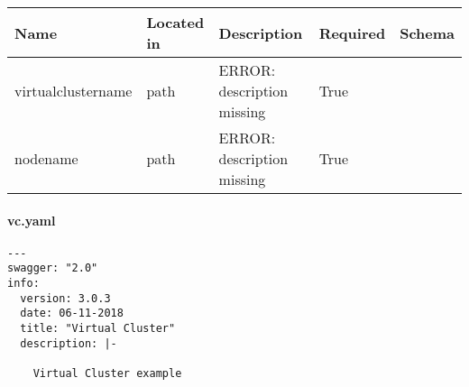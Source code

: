 \documentclass[9pt,]{article}
\let\oldparagraph\paragraph
\renewcommand{\paragraph}[1]{\oldparagraph{#1}\mbox{}}
\begin{document}
\begin{longtable}[]{@{}lllll@{}}
\toprule
Name & Located in & Description & Required & Schema\tabularnewline
\midrule
\endhead
virtualclustername & path & ERROR: description missing & True
&\tabularnewline
nodename & path & ERROR: description missing & True &\tabularnewline
\bottomrule
\end{longtable}

\hypertarget{vc.yaml}{%
\paragraph{vc.yaml}\label{vc.yaml}}

\begin{verbatim}
---
swagger: "2.0"
info:
  version: 3.0.3
  date: 06-11-2018
  title: "Virtual Cluster"
  description: |-

    Virtual Cluster example
    

\end{verbatim}
\end{document}

